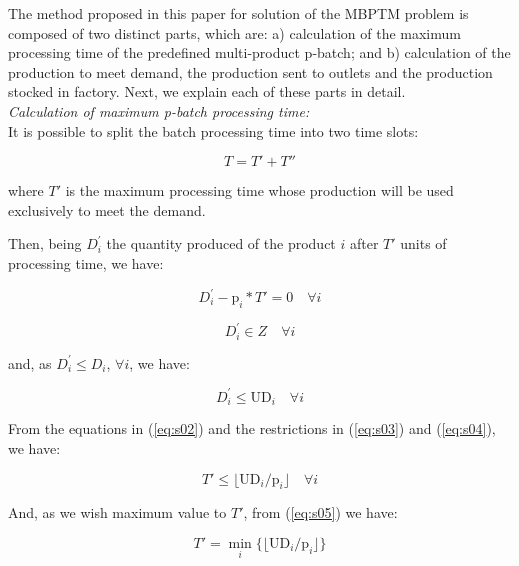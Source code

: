 \documentclass[authoryear,manuscript,12pt]{elsarticle}
\begin{document}
The method proposed in this paper for solution of the MBPTM problem is composed of two distinct parts, which are: a) calculation of the maximum processing time of the predefined multi-product p-batch; and b) calculation of the production to meet demand, the production sent to outlets and the production stocked in factory. Next, we explain each of these parts in detail. \\

\noindent \emph{Calculation of maximum p-batch processing time:} \\

It is possible to split the batch processing time into two time slots:

\begin{equation}
T = T' + T''
\end{equation}

\noindent where $T'$ is the maximum processing time whose production will be used exclusively to meet the demand.

Then, being $D_{i}^{'}$ the quantity produced of the product $i$ after $T'$ units of processing time, we have:

\begin{equation}
\label{eq:s02}
D_{i}^{'} - \textrm{p}_i * T'  = 0 \quad \forall i
\end{equation}

\begin{equation}
\label{eq:s03}
D_{i}^{'} \in Z \quad \forall i
\end{equation}

\noindent and, as $D_{i}^{'} \leq D_i$, $\forall i$, we have:

\begin{equation}
\label{eq:s04}
D_{i}^{'} \leq \textrm{UD}_i\quad \forall i
\end{equation}

From the equations in (\ref{eq:s02}) and the restrictions in (\ref{eq:s03}) and (\ref{eq:s04}), we have:

\begin{equation}
\label{eq:s05}
T' \leq \lfloor{\textrm{UD}_i / \textrm{p}_i}\rfloor \quad \forall i
\end{equation}

And, as we wish maximum value to $T'$, from (\ref{eq:s05}) we have:

\begin{equation}
\label{eq:s06}
T' = \min_i\{\lfloor{\textrm{UD}_i / \textrm{p}_i}\rfloor\}
\end{equation}
\end{document}
